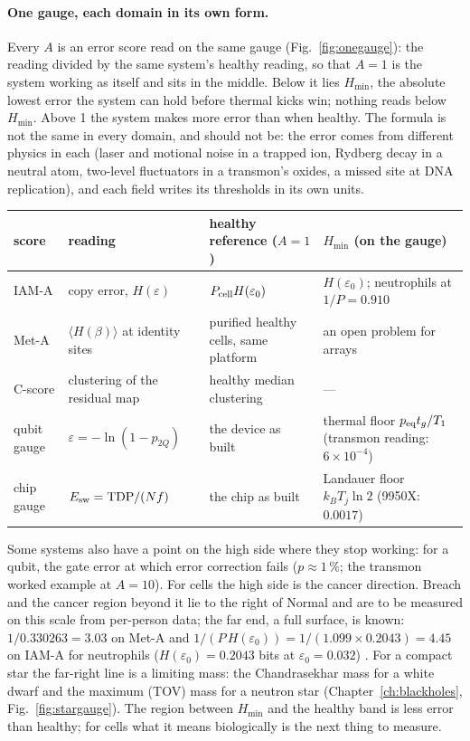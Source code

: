 \paragraph{One gauge, each domain in its own form.} Every $A$ is an error score read on the same gauge (Fig.~\ref{fig:onegauge}): the reading
divided by the same system's healthy reading, so that $A=1$ is the system working as itself and sits in the middle. Below it lies $H_{\min}$, the
absolute lowest error the system can hold before thermal kicks win; nothing reads below $H_{\min}$. Above 1 the system makes more error than when
healthy. The formula is not the same in every domain, and should not be: the error comes from different physics in each (laser and motional noise in a
trapped ion, Rydberg decay in a neutral atom, two-level fluctuators in a transmon's oxides, a missed site at DNA
replication), and each field writes its thresholds in its own units.
\begin{center}\small\begin{tabular}{p{}p{}p{}p{}}\toprule
score & reading & healthy reference ($A=1$) & $H_{\min}$ (on the gauge)\\\midrule
IAM-A & copy error, $H(\varepsilon)$ & $P_{\rm cell}H(\varepsilon_0)$ & $H(\varepsilon_0)$; neutrophils at $1/P=0.910$\\
Met-A & $\langle H(\beta)\rangle$ at identity sites & purified healthy cells, same platform & an open problem for arrays\\
C-score & clustering of the residual map & healthy median clustering & ---\\
qubit gauge & $\varepsilon=-\ln(1-p_{2Q})$ & the device as built & thermal floor $p_{\rm eq}t_g/T_1$ (transmon reading: $6\times10^{-4}$)\\
chip gauge & $E_{\rm sw}=\mathrm{TDP}/(Nf)$ & the chip as built & Landauer floor $k_BT_j\ln2$ (9950X: $0.0017$)\\\bottomrule
\end{tabular}\end{center}
Some systems also have a point on the high side where they stop working: for a qubit, the gate error at which error correction fails ($p\approx1\,\%$;
the transmon worked example at $A=10$). For cells the high side is the cancer direction. Breach and the cancer region beyond it lie to the right of Normal and are to be measured on this scale from per-person data; the far end, a full
surface, is known: $1/0.330263=3.03$ on Met-A and $1/(P\,H(\varepsilon_0))=1/(1.099\times0.2043)=4.45$ on IAM-A for neutrophils ($H(\varepsilon_0)=0.2043$ bits at $\varepsilon_0=0.032$) \calc. For a compact star the far-right line is a
limiting mass: the Chandrasekhar mass for a white dwarf and the maximum (TOV) mass for a neutron star (Chapter~\ref{ch:blackholes}, Fig.~\ref{fig:stargauge}). The region between $H_{\min}$ and the healthy
band is less error than healthy; for cells what it means biologically is the next thing to measure.

